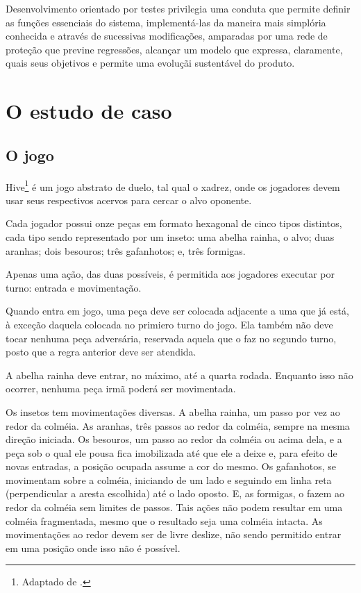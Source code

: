     Desenvolvimento orientado por testes privilegia uma conduta que permite definir as funções essenciais do sistema, implementá-las da maneira mais simplória conhecida e através de sucessivas modificações, amparadas por uma rede de proteção que previne regressões, alcançar um modelo que expressa, claramente, quais seus objetivos e permite uma evoluçãi sustentável do produto.

  \section{O estudo de caso}

    \subsection{O jogo}

      Hive\footnote{Adaptado de \cite{UltraBoardGames2020}.} é um jogo abstrato de duelo, tal qual o xadrez, onde os jogadores devem usar seus respectivos acervos para cercar o alvo oponente.

      Cada jogador possui onze peças em formato hexagonal de cinco tipos distintos, cada tipo sendo representado por um inseto: uma abelha rainha, o alvo; duas aranhas; dois besouros; três gafanhotos; e, três formigas.

      Apenas uma ação, das duas possíveis, é permitida aos jogadores executar por turno: entrada e movimentação.

      Quando entra em jogo, uma peça deve ser colocada adjacente a uma que já está, à exceção daquela colocada no primiero turno do jogo. Ela também não deve tocar nenhuma peça adversária, reservada aquela que o faz no segundo turno, posto que a regra anterior deve ser atendida.

      A abelha rainha deve entrar, no máximo, até a quarta rodada. Enquanto isso não ocorrer, nenhuma peça irmã poderá ser movimentada.

      Os insetos tem movimentações diversas. A abelha rainha, um passo por vez ao redor da colméia. As aranhas, três passos ao redor da colméia, sempre na mesma direção iniciada. Os besouros, um passo ao redor da colméia ou acima dela, e a peça sob o qual ele pousa fica imobilizada até que ele a deixe e, para efeito de novas entradas, a posição ocupada assume a cor do mesmo. Os gafanhotos, se movimentam sobre a colméia, iniciando de um lado e seguindo em linha reta (perpendicular a aresta escolhida) até o lado oposto. E,  as formigas, o fazem ao redor da colméia sem limites de passos. Tais ações não podem resultar em uma colméia fragmentada, mesmo que o resultado seja uma colméia intacta. As movimentações ao redor devem ser de livre deslize, não sendo permitido entrar em uma posição onde isso não é possível.

